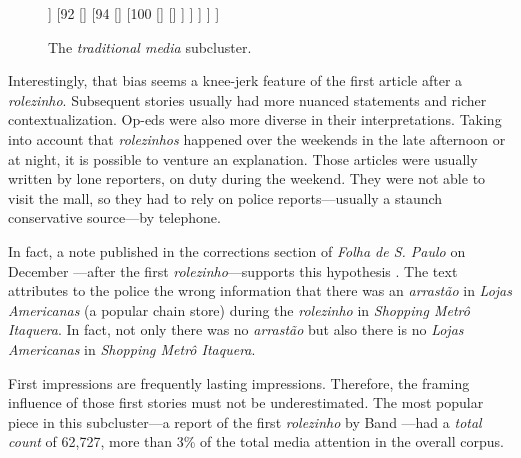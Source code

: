 \begin{figure}
\centering
\begin{forest}
[94, for tree={grow=east,anchor=west,child anchor=west}
	[{\autocite[][\emph{Folha de S. Paulo}: Wave of \emph{rolezinhos}]{folha_onda}}]
	[82
		[83
			[{\autocite[][\emph{Band}: First \emph{rolezinho}]{bandnewstv_arrastao_itaquera}}]
			[{\autocite[][\emph{Folha de S. Paulo}: First \emph{rolezinho}]{folha_arrastao_itaquera}}]
		]
		[92
			[{\autocite[][\emph{Folha de S. Paulo}: Court injunctions against \emph{rolezinhos}]{folha_liminar_shoppings}}]
			[94
				[{\autocite[][\emph{G1}: Security guard is beaten in \emph{rolezinho}]{g1_guardaespancado}}]
				[100
					[{\autocite[][\emph{Folha de S. Paulo}: Rubber bullets]{folha_confronto_itaquera}}]
					[{\autocite[][\emph{G1}: Second \emph{rolezinho}]{g1_guarulhos}}]
				]
			]
		]
	]
]
\end{forest}
\caption{The \emph{traditional media} subcluster.}
\label{traditionalmedia_subcluster}
\end{figure}

Interestingly, that bias seems a knee-jerk feature of the first article after a \emph{rolezinho}. Subsequent stories usually had more nuanced statements and richer contextualization. Op-eds were also more diverse in their interpretations. Taking into account that \emph{rolezinhos} happened over the weekends in the late afternoon or at night, it is possible to venture an explanation. Those articles were usually written by lone reporters, on duty during the weekend. They were not able to visit the mall, so they had to rely on police reports---usually a staunch conservative source---by telephone.

In fact, a note published in the corrections section of \emph{Folha de S. Paulo} on December ---after the first \emph{rolezinho}---supports this hypothesis \autocite{folha_erramos_arrastao_itaquera}. The text attributes to the police the wrong information that there was an \emph{arrastão} in \emph{Lojas Americanas} (a popular chain store) during the \emph{rolezinho} in \emph{Shopping Metrô Itaquera}. In fact, not only there was no \emph{arrastão} but also there is no \emph{Lojas Americanas} in \emph{Shopping Metrô Itaquera}.

First impressions are frequently lasting impressions. Therefore, the framing influence of those first stories must not be underestimated. The most popular piece in this subcluster---a report of the first \emph{rolezinho} by Band \autocite{band_arrastao_itaquera}---had a \emph{total count} of 62,727, more than 3\% of the total media attention in the overall corpus. 

